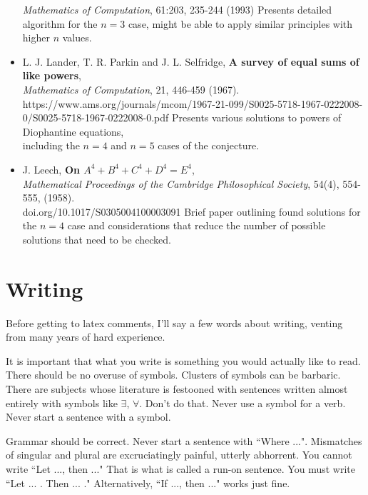 \documentclass[psamsfonts]{amsart}
\theoremstyle{definition}
\theoremstyle{remark}
\numberwithin{equation}{section}
\begin{document}
\begin{itemize}
        \textit{Mathematics of Computation}, 61:203, 235-244 (1993)
        \subitem Presents detailed algorithm for the $n=3$ case, might be able to apply similar principles with higher $n$ values. \\
    \item L. J. Lander, T. R. Parkin and J. L. Selfridge,
       {\bf A survey of equal sums of like powers}, \\
        \textit{Mathematics of Computation}, 21, 446-459 (1967). \\
        https://www.ams.org/journals/mcom/1967-21-099/S0025-5718-1967-0222008-0/S0025-5718-1967-0222008-0.pdf 
        \subitem Presents various solutions to powers of Diophantine equations, \\
        including the $n=4$ and $n=5$ cases of the conjecture. 
    \item J. Leech, {\bf On $A^4 + B^4 + C^4 + D^4 = E^4$}, \\ 
        \textit{Mathematical Proceedings of the Cambridge Philosophical Society}, 54(4), 554-555, (1958). \\
        doi.org/10.1017/S0305004100003091
        \subitem Brief paper outlining found solutions for the $n=4$ case and considerations that reduce the number of possible solutions that need to be checked. 
\end{itemize}












\section{Writing}  Before getting to latex comments, I'll say a few words about writing, venting from many years of hard experience. 

It is important that what you write is something you would actually like to read.  There should be no overuse of symbols.
Clusters of symbols can be barbaric.  There are subjects whose literature is festooned with sentences written almost entirely with symbols like $\exists$, $\forall$.  Don't do that. Never use a symbol for a verb.  Never start a sentence with a symbol.  

Grammar should be correct.  Never start a sentence with ``Where ...".   
Mismatches of singular and plural are excruciatingly painful, utterly abhorrent.  You cannot write
``Let ..., then ..."  That is what is called a run-on sentence. You must write ``Let ... .  Then ... ."
Alternatively, ``If ..., then ..."  works just fine.
\end{document}
